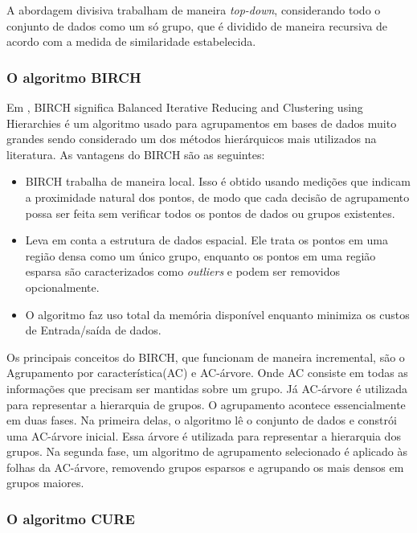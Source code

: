 A abordagem divisiva trabalham de maneira \textit{top-down}, considerando todo o conjunto de dados como um só
grupo, que é dividido de maneira recursiva de acordo com a medida de similaridade
estabelecida.

\subsubsection{O algoritmo BIRCH}

Em \cite{Zhang1996}, BIRCH significa Balanced Iterative Reducing and Clustering using Hierarchies é um algoritmo usado para agrupamentos em bases de dados muito grandes sendo considerado um dos métodos hierárquicos mais utilizados na literatura. As vantagens do BIRCH são as seguintes:

\begin{itemize}
	\item BIRCH trabalha de maneira local. Isso é obtido usando medições que indicam a proximidade natural dos pontos, de modo que cada decisão de agrupamento possa ser feita sem verificar todos os pontos de dados ou grupos existentes.
	\item Leva em conta a estrutura de dados espacial. Ele trata os pontos em uma região densa como um único grupo, enquanto os pontos em uma região esparsa são caracterizados como \textit{outliers} e podem ser removidos opcionalmente.
	\item O algoritmo faz uso total da memória disponível enquanto minimiza os custos de Entrada/saída de dados.
\end{itemize}

Os principais conceitos do BIRCH, que funcionam de maneira incremental, são o Agrupamento por característica(AC) e AC-árvore. Onde AC consiste em todas as informações que precisam ser mantidas sobre um grupo.
Já AC-árvore é utilizada para representar a hierarquia de grupos.
O agrupamento acontece essencialmente em duas fases. Na primeira delas, o algoritmo lê o conjunto de dados e constrói uma AC-árvore inicial. Essa árvore é utilizada para representar a hierarquia dos grupos. Na segunda fase, um algoritmo de agrupamento selecionado é aplicado às folhas da AC-árvore, removendo grupos esparsos e agrupando os mais densos em grupos maiores.

\subsubsection{O algoritmo CURE}

